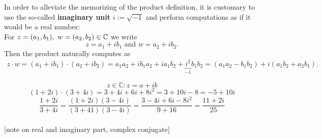 \begin{frame}
In order to alleviate the memorizing of the product definition, it is customary to use the so-called \textbf{\color{defgruen} imaginary unit} $i:=\sqrt{-1}$ and perform computations as if it would be a real number: \\
\vspace{0.3cm}
{\color{defgruen}For $z = (a_1, b_1),~w=(a_2, b_2) \in {\mathbb{C}}$ we write $$z = a_1 +ib_1\text{ and }w = a_2 +ib_2.$$}
Then the product naturally computes as
\begin{align*}
z\cdot w = (a_1 +ib_1)\cdot(a_2+ib_2)
=a_1a_2+ib_1a_2+ia_1b_2+\underbrace{i^2}_{-1}b_1b_2 
={(a_1a_2-b_1b_2)} + i{(a_1b_2+a_2b_1)}.
\end{align*}
\begin{ex}
	\blank
	\begin{equation*}
	z \in \mathbb{C} : z = a + ib
	\end{equation*}
	\begin{equation*}
	(1+2i)\cdot(3+4i) =3+4i+6i+8i^2 = 3+10i-8=-5+10i
	\end{equation*}
	\begin{equation*}
	\frac{1+2i}{3+4i} = \frac{(1+2i)(3-4i)}{(3+41)(3-4i)} = \frac{3-4i+6i-8i^2}{9+16} = \frac{11+2i}{25}
	\end{equation*}
	~\\
	{\small\color{header}[note on real and imaginary part, complex conjugate]}
\end{ex}
\end{frame}



